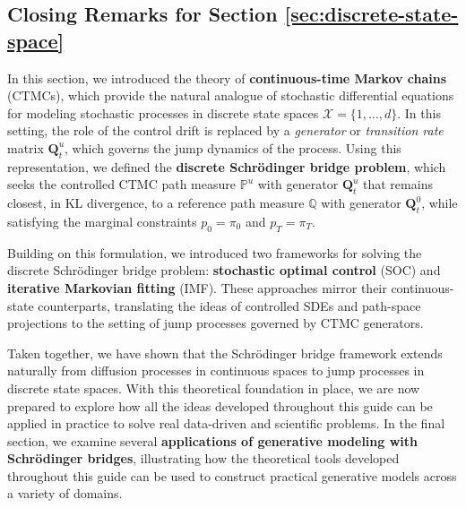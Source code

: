 \documentclass{article}
\begin{document}
\subsection{Closing Remarks for Section \ref{sec:discrete-state-space}}
In this section, we introduced the theory of \textbf{continuous-time Markov chains} (CTMCs), which provide the natural analogue of stochastic differential equations for modeling stochastic processes in discrete state spaces $\mathcal{X}=\{1,\dots,d\}$. In this setting, the role of the control drift is replaced by a \textit{generator} or \textit{transition rate} matrix $\boldsymbol{Q}_t^u$, which governs the jump dynamics of the process. Using this representation, we defined the \textbf{discrete Schrödinger bridge problem}, which seeks the controlled CTMC path measure $\mathbb{P}^u$ with generator $\boldsymbol{Q}_t^u$ that remains closest, in KL divergence, to a reference path measure $\mathbb{Q}$ with generator $\boldsymbol{Q}_t^0$, while satisfying the marginal constraints $p_0=\pi_0$ and $p_T=\pi_T$.

Building on this formulation, we introduced two frameworks for solving the discrete Schrödinger bridge problem: \textbf{stochastic optimal control} (SOC) and \textbf{iterative Markovian fitting} (IMF). These approaches mirror their continuous-state counterparts, translating the ideas of controlled SDEs and path-space projections to the setting of jump processes governed by CTMC generators.

Taken together, we have shown that the Schrödinger bridge framework extends naturally from diffusion processes in continuous spaces to jump processes in discrete state spaces. With this theoretical foundation in place, we are now prepared to explore how all the ideas developed throughout this guide can be applied in practice to solve real data-driven and scientific problems. In the final section, we examine several \textbf{applications of generative modeling with Schrödinger bridges}, illustrating how the theoretical tools developed throughout this guide can be used to construct practical generative models across a variety of domains.

\newpage
\end{document}
